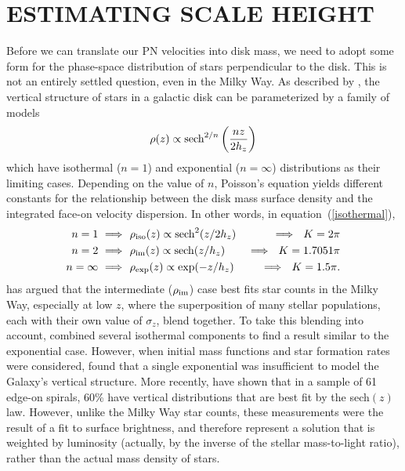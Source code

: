 \documentclass[12pt,preprint]{emulateapj}
\newcommand{\Rarrow}{\ \Longrightarrow\ \ }
\begin{document}
\section{ESTIMATING SCALE HEIGHT}
Before we can translate our PN velocities into disk mass, we need to adopt some form for the phase-space distribution of stars perpendicular to the disk.   This is not an entirely settled question, even in the Milky Way.  As described by \citet{vdK88}, the vertical structure of stars in a galactic disk can be parameterized by a family of models 
\begin{equation}
\rho(z) \propto {\rm sech}^{2/n} \left( {n z \over 2 h_z} \right)
\label{family}
\end{equation}
which have isothermal ($n = 1$) and exponential ($n = \infty$) distributions
as their limiting cases.  Depending on the value of $n$, Poisson's
equation yields different constants for the relationship between the disk
mass surface density and the integrated face-on velocity dispersion.  
In other words, in equation~(\ref{isothermal}),
\begin{eqnarray}
n = 1  \Rarrow& \rho_{\rm iso}(z)  \propto {\rm sech}^2 (z /2 h_z) &\Rarrow K = 2 \pi \\
n = 2   \Rarrow& \rho_{\rm im}(z)   \propto {\rm sech} (z / h_z)    &\Rarrow K = 1.7051 \pi \nonumber \\
n = \infty  \Rarrow& \rho_{\rm exp}(z)  \propto \exp(-z / h_z)          &\Rarrow K = 1.5 \pi. \nonumber 
\label{cases}
\end{eqnarray}
 has argued that the intermediate ($\rho_{\rm im}$) case best fits star counts in the Milky Way, especially at low $z$, where the superposition of many stellar populations, each with their own value of $\sigma_z$, blend together.  To take this blending into account, \citet{siebert} combined several isothermal components to find a result similar to the exponential case.  However, when initial mass functions and star formation rates were considered, \citet{haywood} found that a single exponential was insufficient to model the Galaxy's vertical structure.  More recently, \citet{sd00} have shown that in a sample of 61 edge-on spirals, 60\% have vertical distributions that are best fit by the sech$(z)$ law.   However, unlike the Milky Way star counts, these measurements were the result of a fit to surface brightness, and therefore represent a solution that is weighted by luminosity (actually, by the inverse of the stellar mass-to-light ratio), rather than the actual mass density of stars.
\end{document}
